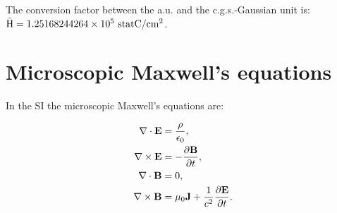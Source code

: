 \documentclass[12pt,a4paper,twoside]{report}
\def\htoh{7.95774715242\times 10^{1}}
\def\barhcgs{1.25168244264\times 10^{5}}
\begin{document}
{%


{\color{green} The conversion factor between the a.u. and the c.g.s.-Gaussian 
unit is:
${\rm \bar H} = \barhcgs\ {\rm statC}/{\rm cm}^2$.
}

\newpage
{\color{coral}\section{Microscopic Maxwell's equations}}
\color{black}

In the SI the microscopic Maxwell's equations are:

\begin{tcolorbox}
\begin{align}
\nabla \cdot {\bf E} &= {\rho\over {\epsilon_0}}, \\
\nabla \times {\bf E} &= -{\partial {\bf B} \over \partial t}, \\
\nabla \cdot {\bf B} &= 0, \\
\nabla \times {\bf B} &= \mu_0{\bf J}+ {1\over c^2}
{\partial {\bf E} \over \partial t}. 
\end{align}
\end{tcolorbox}

}
\end{document}
